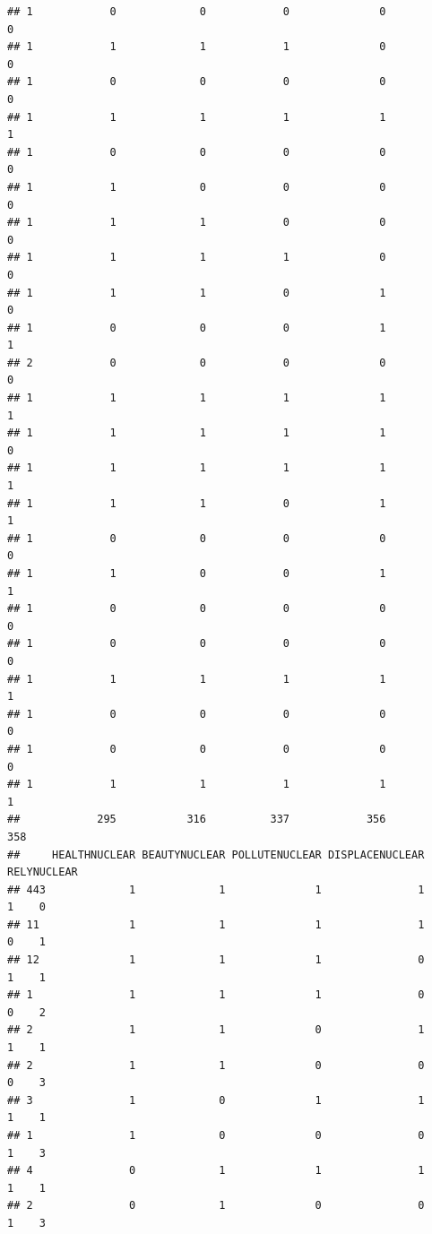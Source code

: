 \documentclass[
]{article}
\begin{document}
\begin{verbatim}
## 1            0             0            0              0           0
## 1            1             1            1              0           0
## 1            0             0            0              0           0
## 1            1             1            1              1           1
## 1            0             0            0              0           0
## 1            1             0            0              0           0
## 1            1             1            0              0           0
## 1            1             1            1              0           0
## 1            1             1            0              1           0
## 1            0             0            0              1           1
## 2            0             0            0              0           0
## 1            1             1            1              1           1
## 1            1             1            1              1           0
## 1            1             1            1              1           1
## 1            1             1            0              1           1
## 1            0             0            0              0           0
## 1            1             0            0              1           1
## 1            0             0            0              0           0
## 1            0             0            0              0           0
## 1            1             1            1              1           1
## 1            0             0            0              0           0
## 1            0             0            0              0           0
## 1            1             1            1              1           1
##            295           316          337            356         358
##     HEALTHNUCLEAR BEAUTYNUCLEAR POLLUTENUCLEAR DISPLACENUCLEAR RELYNUCLEAR     
## 443             1             1              1               1           1    0
## 11              1             1              1               1           0    1
## 12              1             1              1               0           1    1
## 1               1             1              1               0           0    2
## 2               1             1              0               1           1    1
## 2               1             1              0               0           0    3
## 3               1             0              1               1           1    1
## 1               1             0              0               0           1    3
## 4               0             1              1               1           1    1
## 2               0             1              0               0           1    3

\end{verbatim}
\end{document}
